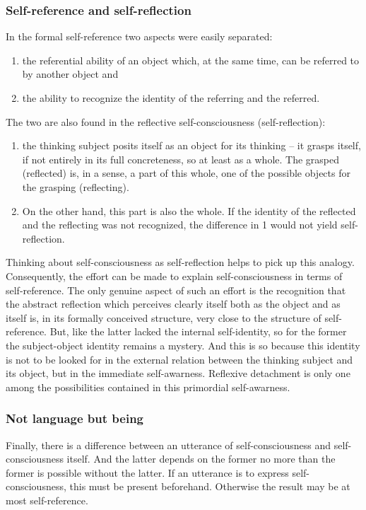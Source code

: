 \subsubsection{Self-reference and self-reflection}
 In the formal self-reference  two aspects were easily separated:
\begin{enumerate}
\item the referential ability of an object which, at the same time, can be referred to by another object  and
\item the ability to recognize the identity of the referring and the referred.
\end{enumerate}
The two are also found in the reflective self-consciousness (self-reflection):
\begin{enumerate}
\item the thinking subject posits itself as an object for its thinking -- it grasps itself, if not entirely in its full 
concreteness, so at least as a whole. The grasped (reflected) is, in a sense, a part of this whole, one of the 
possible objects for the grasping (reflecting).
\item On the other hand, this part is also the whole. If the identity of the reflected and the reflecting was not 
recognized, the difference in 1 would not yield self-reflection.
\end{enumerate}
Thinking about self-consciousness as self-reflection helps to pick up this analogy. Consequently, the effort can 
be made to explain self-consciousness in terms of self-reference. 
The only genuine aspect of such an effort is the 
recognition that the abstract reflection which perceives clearly itself both as the object and as itself is, in its 
formally conceived structure, very close to the structure of self-reference. 
But, like the latter lacked the internal self-identity, so for the former the 
subject-object identity remains a mystery. And this is so because this identity is 
not to be looked for in the external relation between the thinking subject and its object,
but in the immediate self-awarness. Reflexive detachment is only one among the possibilities
contained in this primordial self-awarness.

\subsubsection{Not language but being}
Finally, there is a difference between an utterance of self-consciousness and self-consciousness itself. And the 
latter depends on the former no more than the former is possible without the latter. If an utterance is to express 
self-consciousness, this must be present beforehand. Otherwise the result may be at most self-reference.

